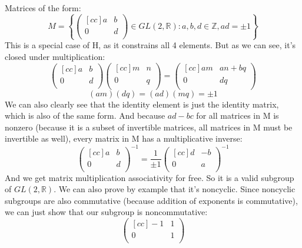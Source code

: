\begin{enumerate}
\begin{enumerate}
Matrices of the form:
$$
  M = 
  \left \{
      \begin{pmatrix}[cc]
        a & b \\
        0 & d \\
      \end{pmatrix}
      \in GL(2,\mathds{R}) : a,b,d \in \mathds{Z}, ad = \pm 1
  \right \}
$$
This is a special case of H, as it constrains all 4 elements. But as we can see, it's closed under multiplication:
$$
      \begin{pmatrix}[cc]
        a & b \\
        0 & d \\
      \end{pmatrix}
      \begin{pmatrix}[cc]
        m & n \\
        0 & q \\
      \end{pmatrix}
  = 
      \begin{pmatrix}[cc]
        am & an+bq \\
        0 & dq \\
      \end{pmatrix}
$$
$$
(am)(dq) = (ad)(mq) = \pm 1
$$
We can also clearly see that the identity element is just the identity matrix, which is also of the same form. And because $ad-bc$ for all matrices in M is nonzero (because it is a subset of invertible matrices, all matrices in M must be invertible as well), every matrix in M has a multiplicative inverse:
$$
      \begin{pmatrix}[cc]
        a & b \\
        0 & d \\
      \end{pmatrix} ^{-1}
= 
     \frac{1}{\pm 1}
      \begin{pmatrix}[cc]
        d & -b \\
        0 & a \\
      \end{pmatrix} ^{-1}
$$
And we get matrix multiplication associativity for free. So it is a valid subgroup of $GL(2,\mathds{R})$. We can also prove by example that it's noncyclic. Since noncyclic subgroups are also commutative (because addition of exponents is commutative), we can just show that our subgroup is noncommutative:
$$
      \begin{pmatrix}[cc]
        -1 & 1 \\
         0 & 1 \\
      \end{pmatrix}
$$
\end{enumerate}
\end{enumerate}
